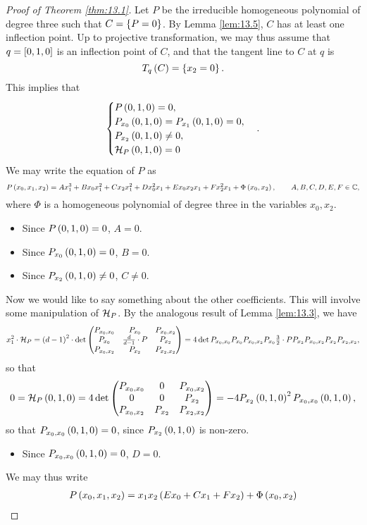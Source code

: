 \begin{proof}[Proof of Theorem \ref{thm:13.1}]
Let $ P $ be the irreducible homogeneous polynomial of degree three such that $ C = \cb{P = 0} $. By Lemma \ref{lem:13.5}, $ C $ has at least one inflection point. Up to projective transformation, we may thus assume that $ q = \sb{0, 1, 0} $ is an inflection point of $ C $, and that the tangent line to $ C $ at $ q $ is
$$ T_q\rb{C} = \cb{x_2 = 0}. $$
This implies that
$$
\begin{cases}
P\rb{0, 1, 0} = 0, \\
P_{x_0}\rb{0, 1, 0} = P_{x_1}\rb{0, 1, 0} = 0, \\
P_{x_2}\rb{0, 1, 0} \ne 0, \\
\HH_P\rb{0, 1, 0} = 0
\end{cases}.
$$
We may write the equation of $ P $ as
$$ P\rb{x_0, x_1, x_2} = Ax_1^3 + Bx_0x_1^2 + Cx_2x_1^2 + Dx_0^2x_1 + Ex_0x_2x_1 + Fx_2^2x_1 + \Phi\rb{x_0, x_2}, \qquad A, B, C, D, E, F \in \C, $$
where $ \Phi $ is a homogeneous polynomial of degree three in the variables $ x_0, x_2 $.
\begin{itemize}
\item Since $ P\rb{0, 1, 0} = 0 $, $ A = 0 $.
\item Since $ P_{x_0}\rb{0, 1, 0} = 0 $, $ B = 0 $.
\item Since $ P_{x_2}\rb{0, 1, 0} \ne 0 $, $ C \ne 0 $.
\end{itemize}
Now we would like to say something about the other coefficients. This will involve some manipulation of $ \HH_P $. By the analogous result of Lemma \ref{lem:13.3}, we have
$$ x_1^2 \cdot \HH_P = \rb{d - 1}^2 \cdot \det\threebythree{P_{x_0, x_0}}{P_{x_0}}{P_{x_0, x_2}}{P_{x_0}}{\tfrac{d}{d - 1} \cdot P}{P_{x_2}}{P_{x_0, x_2}}{P_{x_2}}{P_{x_2, x_2}} = 4\det{P_{x_0, x_0}}{P_{x_0}}{P_{x_0, x_2}}{P_{x_0}}{\tfrac{3}{2} \cdot P}{P_{x_2}}{P_{x_0, x_2}}{P_{x_2}}{P_{x_2, x_2}}, $$
so that
$$ 0 = \HH_P\rb{0, 1, 0} = 4\det\threebythree{P_{x_0, x_0}}{0}{P_{x_0, x_2}}{0}{0}{P_{x_2}}{P_{x_0, x_2}}{P_{x_2}}{P_{x_2, x_2}} = -4P_{x_2}\rb{0, 1, 0}^2P_{x_0, x_0}\rb{0, 1, 0}, $$
so that $ P_{x_0, x_0}\rb{0, 1, 0} = 0 $, since $ P_{x_2}\rb{0, 1, 0} $ is non-zero.
\begin{itemize}
\item Since $ P_{x_0, x_0}\rb{0, 1, 0} = 0 $, $ D = 0 $.
\end{itemize}
We may thus write
\begin{align*}
P\rb{x_0, x_1, x_2}
& = x_1x_2\rb{Ex_0 + Cx_1 + Fx_2} + \Phi\rb{x_0, x_2} \\

\end{align*}
\end{proof}
